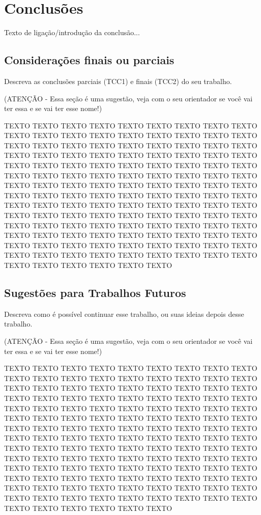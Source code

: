 \chapter{Conclusões}
\label{cap:conclusoes}

Texto de ligação/introdução da conclusão...

\section{Considerações finais ou parciais}
\label{cap:conclusoes:sec:consideracoes:finais:parciais}

Descreva as conclusões parciais (TCC1) e finais (TCC2) do seu trabalho.

(ATENÇÃO - Essa seção é uma sugestão, veja com o seu orientador se você vai ter essa e se vai ter esse nome!)

TEXTO TEXTO TEXTO TEXTO TEXTO TEXTO TEXTO TEXTO TEXTO TEXTO TEXTO TEXTO TEXTO TEXTO TEXTO TEXTO TEXTO TEXTO TEXTO TEXTO TEXTO TEXTO TEXTO TEXTO TEXTO TEXTO TEXTO TEXTO TEXTO TEXTO TEXTO TEXTO TEXTO TEXTO TEXTO TEXTO TEXTO TEXTO TEXTO TEXTO TEXTO TEXTO TEXTO TEXTO TEXTO TEXTO TEXTO TEXTO TEXTO TEXTO TEXTO TEXTO TEXTO TEXTO TEXTO TEXTO TEXTO TEXTO TEXTO TEXTO TEXTO TEXTO TEXTO TEXTO TEXTO TEXTO TEXTO TEXTO TEXTO TEXTO TEXTO TEXTO TEXTO TEXTO TEXTO TEXTO TEXTO TEXTO TEXTO TEXTO TEXTO TEXTO TEXTO TEXTO TEXTO TEXTO TEXTO TEXTO TEXTO TEXTO TEXTO TEXTO TEXTO TEXTO TEXTO TEXTO TEXTO TEXTO TEXTO TEXTO TEXTO TEXTO TEXTO TEXTO TEXTO TEXTO TEXTO TEXTO TEXTO TEXTO TEXTO TEXTO TEXTO TEXTO TEXTO TEXTO TEXTO TEXTO TEXTO TEXTO TEXTO TEXTO TEXTO TEXTO TEXTO TEXTO TEXTO TEXTO TEXTO TEXTO TEXTO TEXTO

\section{Sugestões para Trabalhos Futuros}
\label{cap:conclusoes:sec:trabalhos:futuros}

Descreva como é possível continuar esse trabalho, ou suas ideias depois desse trabalho.

(ATENÇÃO - Essa seção é uma sugestão, veja com o seu orientador se você vai ter essa e se vai ter esse nome!)

TEXTO TEXTO TEXTO TEXTO TEXTO TEXTO TEXTO TEXTO TEXTO TEXTO TEXTO TEXTO TEXTO TEXTO TEXTO TEXTO TEXTO TEXTO TEXTO TEXTO TEXTO TEXTO TEXTO TEXTO TEXTO TEXTO TEXTO TEXTO TEXTO TEXTO TEXTO TEXTO TEXTO TEXTO TEXTO TEXTO TEXTO TEXTO TEXTO TEXTO TEXTO TEXTO TEXTO TEXTO TEXTO TEXTO TEXTO TEXTO TEXTO TEXTO TEXTO TEXTO TEXTO TEXTO TEXTO TEXTO TEXTO TEXTO TEXTO TEXTO TEXTO TEXTO TEXTO TEXTO TEXTO TEXTO TEXTO TEXTO TEXTO TEXTO TEXTO TEXTO TEXTO TEXTO TEXTO TEXTO TEXTO TEXTO TEXTO TEXTO TEXTO TEXTO TEXTO TEXTO TEXTO TEXTO TEXTO TEXTO TEXTO TEXTO TEXTO TEXTO TEXTO TEXTO TEXTO TEXTO TEXTO TEXTO TEXTO TEXTO TEXTO TEXTO TEXTO TEXTO TEXTO TEXTO TEXTO TEXTO TEXTO TEXTO TEXTO TEXTO TEXTO TEXTO TEXTO TEXTO TEXTO TEXTO TEXTO TEXTO TEXTO TEXTO TEXTO TEXTO TEXTO TEXTO TEXTO TEXTO TEXTO TEXTO TEXTO TEXTO